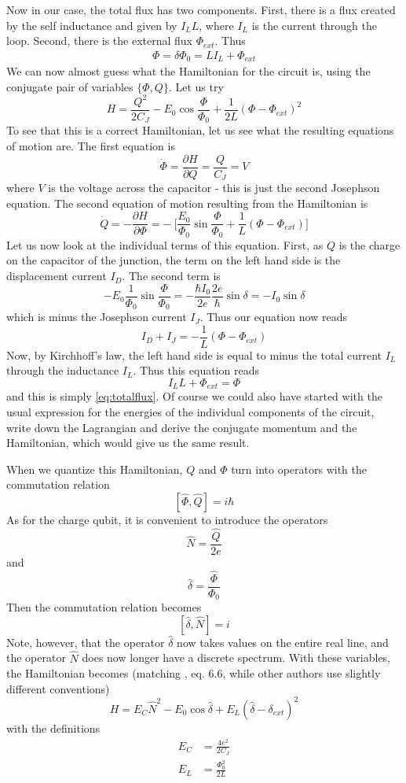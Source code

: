 \documentclass[a4paper, draft]{article}
\theoremstyle{own}
\theoremstyle{remark}
\begin{document}
Now in our case, the total flux has two components. First, there is a flux created by the self inductance and given by $I_L L$, where $I_L$ is the current through the loop. Second, there is the external flux $\Phi_{ext}$. Thus
\begin{align}
\label{eq:totalflux}
\Phi = \delta \Phi_0 = L I_L + \Phi_{ext}
\end{align}
We can now almost guess what the Hamiltonian for the circuit is, using the conjugate pair of variables $\{\Phi, Q\}$. Let us try 
$$
H = \frac{Q^2}{2C_J} - E_0 \cos \frac{\Phi}{\Phi_0} + \frac{1}{2L}( \Phi  - \Phi_{ext})^2
$$
To see that this is a correct Hamiltonian, let us see what the resulting equations of motion are. The first equation is
$$
\dot{\Phi} = \frac{\partial H }{\partial Q} = \frac{Q}{C_J} = V
$$
where $V$ is the voltage across the capacitor - this is just the second Josephson equation. The second equation of motion resulting from the Hamiltonian is 
$$
\dot{Q} = - \frac{\partial H}{\partial \Phi} = - \
\big[ 
\frac{E_0}{\Phi_0} \sin \frac{\Phi}{\Phi_0} + \frac{1}{L} (\Phi - \Phi_{ext})
\big] 
$$
Let us now look at the individual terms of this equation. First, as $Q$ is the charge on the capacitor of the junction, the term on the left hand side is the displacement current $I_D$. The second term is
$$
- E_0 \frac{1}{\Phi_0} \sin \frac{\Phi}{\Phi_0} =  - \frac{\hbar I_0}{2e} \frac{2e}{\hbar} \sin{\delta} = - I_0 \sin \delta
$$
which is minus the Josephson current $I_J$. Thus our equation now reads
$$
I_D  + I_J =  - \frac{1}{L} (\Phi - \Phi_{ext})
$$
Now, by Kirchhoff's law, the left hand side is equal to minus the total current $I_L$ through the inductance $I_L$. Thus this equation reads
$$
 I_L L + \Phi_{ext} = \Phi
$$
and this is simply \eqref{eq:totalflux}. Of course we could also have started with the usual expression for the energies of the individual components of the circuit, write down the Lagrangian and derive the conjugate momentum and the Hamiltonian, which would give us the same result.

When we quantize this Hamiltonian, $Q$ and $\Phi$ turn into operators with the commutation relation
$$
[\hat{\Phi}, \hat{Q}] = i \hbar
$$
As for the charge qubit, it is convenient to introduce the operators
$$
\hat{N} = \frac{\hat{Q}}{2e}
$$
and 
$$
\hat{\delta} = \frac{\hat{\Phi}}{\Phi_0}
$$
Then the commutation relation becomes
$$
[ \hat{\delta}, \hat{N}  ] =  i 
$$
Note, however, that the operator $\hat{\delta}$ now takes values on the entire real line, and the operator $\hat{N}$ does now longer have a discrete spectrum. With these variables, the Hamiltonian becomes (matching \cite{WendinShumeiko}, eq. 6.6, while other authors use slightly different conventions)
$$
H =  E_C \hat{N}^2 - E_0 \cos \hat{\delta} + E_L ( \hat{\delta}  - \delta_{ext})^2
$$
with the definitions
\begin{align*}
E_C &= \frac{4e^2}{2C_J}  \\
E_L &= \frac{\Phi_0^2}{2L}
\end{align*}
\end{document}
